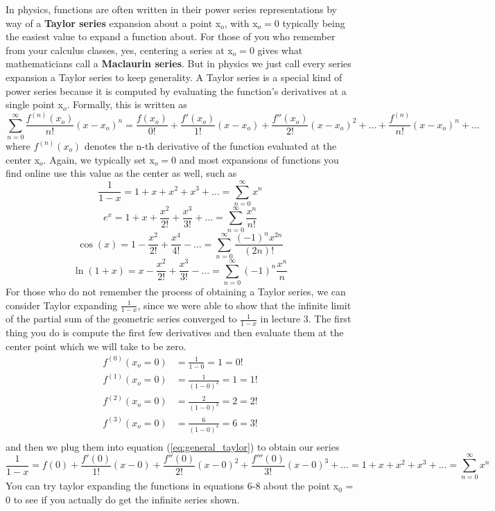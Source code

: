 \documentclass{article}
\newcommand{\be}{\begin{equation}}
\newcommand{\ee}{\end{equation}}
\newcommand{\sumzero}{\sum_{n=0}^\infty}
\begin{document}
In physics, functions are often written in their power series representations by way of a \textbf{Taylor series} expansion about a point x$_o$, with x$_o = 0$ typically being the easiest value to expand a function about.
For those of you who remember from your calculus classes, yes, centering a series at x$_o = 0$ gives what mathematicians call a \textbf{Maclaurin series}.
But in physics we just call every series expansion a Taylor series to keep generality.
A Taylor series is a special kind of power series because it is computed by evaluating the function's derivatives at a single point x$_o$.
Formally, this is written as
\be \label{eq:general_taylor}
\sumzero \frac{f^{(n)} (x_o)} {n!} (x - x_o)^n = \frac{f(x_o)}{0!} + \frac{f'(x_o)}{1!} (x - x_o) + \frac{f''(x_o)}{2!} (x - x_o)^2 + \hdots + \frac{ f^{(n)} }{n!}(x - x_o)^n + \hdots
\ee
where $f^{(n)} (x_o)$ denotes the n-th derivative of the function evaluated at the center x$_o$.
Again, we typically set x$_o = 0$ and most expansions of functions you find online use this value as the center as well, such as
\be
\frac{1}{1-x} = 1 + x + x^2 + x^3 + \hdots = \sumzero x^n
\ee
\be
e^x = 1 + x + \frac{x^2}{2!} + \frac{x^3}{3!} + \hdots = \sumzero \frac{x^n}{n!}
\ee
\be
\cos(x) = 1 - \frac{x^2}{2!} + \frac{x^4}{4!} - \hdots = \sumzero \frac{(-1)^n x^{2n}}{(2n)!}
\ee
\be
\ln(1+x) = x - \frac{x^2}{2!} + \frac{x^3}{3!} - \hdots = \sumzero (-1)^{n} \frac{x^n}{n}
\ee
For those who do not remember the process of obtaining a Taylor series, we can consider Taylor expanding $\frac{1}{1 - x}$, since we were able to show that the infinite limit of the partial sum of the geometric series converged to $\frac{1}{1-x}$ in lecture 3.
The first thing you do is compute the first few derivatives and then evaluate them at the center point which we will take to be zero.
\be
\begin{split}
f^{(0)} (x_o = 0) &= \frac{1}{1-0} = 1 = 0!\\
f^{(1)} (x_o = 0) &= \frac{1}{(1-0)^2} = 1 = 1!\\
f^{(2)} (x_o = 0) &= \frac{2}{(1-0)^3} = 2 = 2!\\
f^{(3)} (x_o = 0) &= \frac{6}{(1-0)^4} = 6 = 3!\\
\end{split}
\ee
and then we plug them into equation (\ref{eq:general_taylor}) to obtain our series
\be
\frac{1}{1-x} = f(0) + \frac{f'(0)}{1!} (x - 0) + \frac{f''(0)}{2!} (x - 0)^2 + \frac{f'''(0)}{3!} (x - 0)^3 + \hdots = 1 + x + x^2 + x^3 + \hdots = \sumzero x^n
\ee
You can try taylor expanding the functions in equations 6-8 about the point x$_0$ = 0 to see if you actually do get the infinite series shown.
\end{document}
